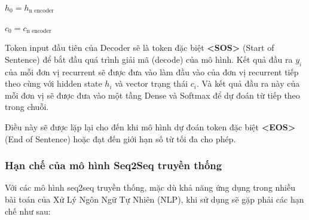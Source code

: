 \documentclass[a4paper, 12pt, openany]{book}
\begin{document}
\begin{center}

    \(h_0 = h_{\text{n encoder}}\)

    \(c_0 = c_{\text{n encoder}}\)
\end{center}

Token input đầu tiên của Decoder sẽ là token đặc biệt \textbf{<SOS>} (Start of Sentence) để bắt đầu quá trình giải mã (decode) của mô hình.
Kết quả đầu ra \(y_i\) của mỗi đơn vị recurrent sẽ được đưa vào làm đầu vào của đơn vị recurrent tiếp theo cùng với hidden state \(h_i\) và vector trạng thái \(c_i\).
Và kết quả đầu ra này của mỗi đơn vị sẽ được đưa vào một tầng Dense và Softmax để dự đoán từ tiếp theo trong chuỗi.

Điều này sẽ được lặp lại cho đến khi mô hình dự đoán token đặc biệt \textbf{<EOS>} (End of Sentence) hoặc đạt đến giới hạn số từ tối đa cho phép.

\subsubsection{Hạn chế của mô hình Seq2Seq truyền thống}

Với các mô hình \acl{seq2seq} truyền thống, mặc dù khả năng ứng dụng trong nhiều bài toán của Xử Lý Ngôn Ngữ Tự Nhiên (NLP), khi sử dụng sẽ gặp phải các hạn chế như sau:
\end{document}
